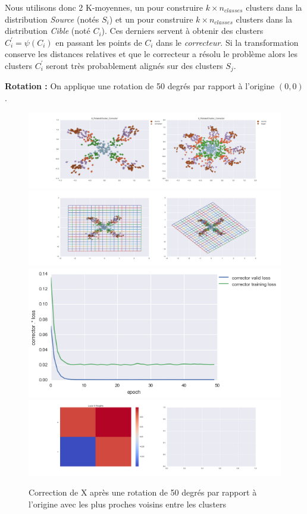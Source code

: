 Nous utilisons donc 2 K-moyennes, un pour construire $k\times n_{classes}$ clusters 
dans la distribution \emph{Source} (notés $S_i$) et un pour construire $k\times n_{classes}$ 
clusters dans la distribution \emph{Cible} (noté $C_i$). Ces derniers servent à obtenir 
des clusters $C_i^\prime = \psi(C_i)$ en passant les points de $C_i$ dans le \emph{correcteur}.
Si la transformation conserve les distances relatives et que le correcteur a résolu le problème
alors les clusters $C_i^\prime$ seront très probablement alignés sur des clusters $S_j$.


{\Large \textbf{Rotation :}} On applique une rotation de 50 degrés par rapport à l'origine $(0,0)$.

\begin{figure}[H] %
\centering
\includegraphics[width=\linewidth]{fig/24-05-2016/X/X_RotatedCluster_Corrector-DATA.png}
\includegraphics[width=\linewidth]{fig/24-05-2016/X/X_RotatedCluster_Corrector-GridCheck.png}
\includegraphics[width=0.45\linewidth]{fig/24-05-2016/X/X_RotatedCluster_Corrector-Learning_curve.png}
\includegraphics[width=\linewidth]{fig/24-05-2016/X/X_RotatedCluster_Corrector-W.png}
\caption{Correction de X après une rotation de 50 degrés par rapport à l'origine avec les plus proches voisins entre les clusters}
\label{fig:recap-X-rot-cluster}
\end{figure}


